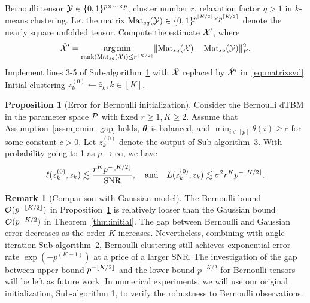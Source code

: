 \documentclass[journal]{IEEEtran}
\theoremstyle{definition}
\newtheorem{prop}{Proposition}
\theoremstyle{definition}
\newtheorem{rmk}{Remark}
\newcommand{\of}[1]{\left(#1\right)}
\DeclarePairedDelimiter{\ceil}{\lceil}{\rceil}
\DeclarePairedDelimiter{\floor}{\lfloor}{\rfloor}
\begin{document}
\begin{itemize}[wide]
\begin{algorithm}[h!]
\caption*{\bf Sub-algorithm 3: Weighted higher-order initialization for Bernoulli observation}
\vspace{.15cm}
\begin{algorithmic}[1] 
\INPUT Bernoulli tensor $\mathcal{Y} \in \{0,1\}^{p\times \cdots \times p}$, cluster number $r$, relaxation factor $\eta > 1$ in $k$-means clustering.
\State  Let the matrix $\mat_{sq} (\tY) \in \{0,1\}^{p^{\floor{K/2}} \times p^{\ceil{K/2}} }$ denote the nearly square unfolded tensor. Compute the estimate $\mathcal{X}'$, where
\small
\begin{equation}\label{eq:matrixsvd}
    \hat \tX' = \argmin_{\text{rank}(\mat_{sq}(\tX)) \leq r^{\ceil{K/2}}} \onormSize{}{ \mat_{sq}(\tX) -  \mat_{sq}(\tY)}_F^2.
\end{equation}
\normalsize
\State Implement lines 3-5 of Sub-algorithm~\hyperref[alg:main]{1} with $\hat {\mathcal{X}}$ replaced by $\hat {\mathcal{X}}'$ in~\eqref{eq:matrixsvd}.
\OUTPUT Initial clustering $z^{(0)}_k \leftarrow \hat z_k, k \in [K]$.
\end{algorithmic}
\end{algorithm}

\begin{prop}[Error for Bernoulli initialization]\label{prop:ber} Consider the Bernoulli dTBM in the parameter space $\mathcal{P}$ {with fixed $r \geq 1, K \geq 2$}. Assume that Assumption~\ref{assmp:min_gap} holds, $\boldsymbol{\theta}$ is balanced, and $\min_{i\in[p]}\theta(i) \geq c$ for some constant $c>0$. Let $ z^{(0)}_k$ denote the output of Sub-algorithm~3. With probability going to 1 {as $p \rightarrow \infty$}, we have
\begin{equation}\label{eq:ini_b}
 \ell(z^{(0)}_k, z_k) \lesssim \frac{r^K p^{- \floor{K/2} }}{\text{SNR}}, \quad \text{and} \quad L(z^{(0)}_k, z_k) \lesssim  {\sigma^2 r^K p^{-\floor{K/2}}}.
\end{equation}
\end{prop}

\begin{rmk}[Comparison with Gaussian model] The Bernoulli bound $\tO(p^{- \floor{K/2} })$ in Proposition~\ref{prop:ber} is relatively looser than the Gaussian bound $\mathcal{O}(p^{- K/2 })$ in Theorem~\ref{thm:initial}. The gap between Bernoulli and Gaussian error decreases as the order $K$ increases. Nevertheless, combining with angle iteration Sub-algorithm~\hyperref[alg:main]{2}, Bernoulli clustering still achieves exponential error rate $\exp \of{ - p^{(K-1)}}$ at a price of a larger SNR.
The investigation of the gap between upper bound $p^{- \floor{K/2}}$ and the lower bound $p^{- K/2}$ for Bernoulli tensors will be left as future work. In numerical experiments, we will use our original initialization, Sub-algorithm 1, to verify the robustness to Bernoulli observations.
\end{rmk}


\end{itemize}
\end{document}
